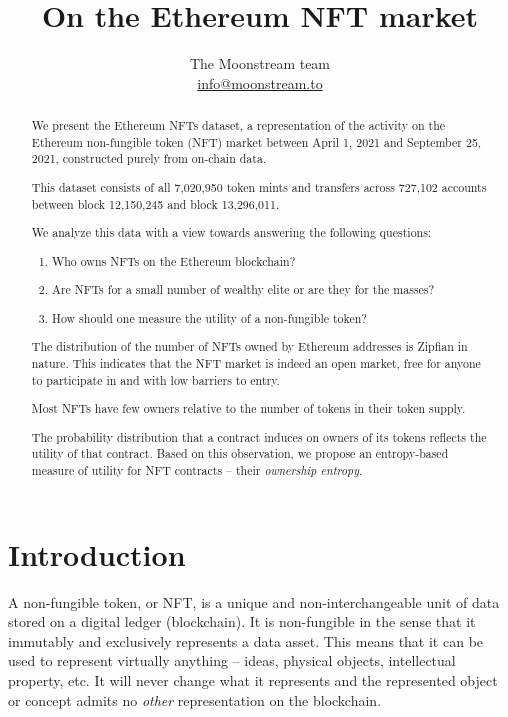 \documentclass{article}
\title{On the Ethereum NFT market}
\author{
    The Moonstream team\\
    \href{mailto:info@moonstream.to}{info@moonstream.to}
}
\begin{document}
\maketitle

\begin{abstract}
We present the Ethereum NFTs dataset, a representation of the activity on the Ethereum non-fungible
token (NFT) market between April 1, 2021 and September 25, 2021, constructed purely from on-chain data.

This dataset consists of all 7,020,950 token mints and transfers across 727,102 accounts between block 12,150,245 and block 13,296,011.

We analyze this data with a view towards answering the following questions:
\begin{enumerate}
\item Who owns NFTs on the Ethereum blockchain?
\item Are NFTs for a small number of wealthy elite or are they for the masses?
\item How should one measure the utility of a non-fungible token?
\end{enumerate}

The distribution of the number of NFTs owned by Ethereum addresses is
Zipfian in nature. This indicates that the NFT market is indeed an open market, free for anyone to
participate in and with low barriers to entry.

Most NFTs have few owners relative to the number of tokens in their token supply.

The probability distribution that a contract induces on owners of its tokens reflects the utility of that contract. Based on this observation, we propose an entropy-based measure of utility for NFT contracts -- their \emph{ownership entropy}.

\end{abstract}

\section{Introduction}

A non-fungible token, or NFT, is a unique and non-interchangeable unit of data
stored on a digital ledger (blockchain)\cite{nft-definition}. It is non-fungible in the sense that it immutably and exclusively represents a data asset. This means that it can be used to represent virtually anything -- ideas, physical objects, intellectual property, etc. It will never change what it represents and the represented object or concept admits no \emph{other} representation on the blockchain.
\end{document}
